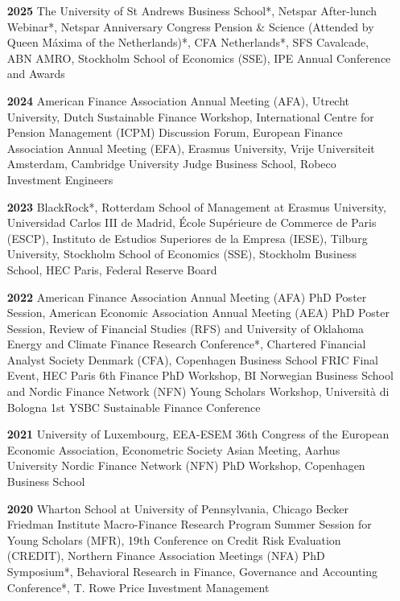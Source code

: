 \documentclass[11pt]{res} %
\begin{document}
\begin{resume}
\begin{itemize}
\item[\textbf{2025}] The University of St Andrews Business School*, Netspar After-lunch Webinar*, Netspar Anniversary Congress Pension \& Science (Attended by Queen Máxima of the Netherlands)*, CFA Netherlands*, SFS Cavalcade, ABN AMRO, Stockholm School of Economics (SSE), IPE Annual Conference and Awards\\[-1ex] 

\item[\textbf{2024}] American Finance Association Annual Meeting (AFA), Utrecht University, Dutch Sustainable Finance Workshop, International Centre for Pension Management (ICPM)  Discussion Forum, European Finance Association Annual Meeting (EFA), Erasmus University, Vrije Universiteit Amsterdam, Cambridge University Judge Business School, Robeco Investment Engineers\\[-1ex] %

\item[\textbf{2023}] BlackRock*, Rotterdam School of Management at Erasmus University, Universidad Carlos III de Madrid, École Supérieure de Commerce de Paris (ESCP), Instituto de Estudios Superiores de la Empresa (IESE), Tilburg University, Stockholm School of Economics (SSE), Stockholm Business School, HEC Paris, Federal Reserve Board\\[-1ex]

\item[\textbf{2022}]  American Finance Association Annual Meeting (AFA) PhD Poster Session, American Economic Association Annual Meeting (AEA) PhD Poster Session, Review of Financial Studies (RFS) and University of Oklahoma Energy and Climate Finance Research Conference*, Chartered Financial Analyst Society Denmark (CFA), Copenhagen Business School FRIC Final Event, HEC Paris 6th Finance PhD Workshop,  BI Norwegian Business School and Nordic Finance Network (NFN) Young Scholars Workshop, Università di Bologna 1st YSBC Sustainable Finance Conference\\[-1ex]

\item[\textbf{2021}]  University of Luxembourg, EEA-ESEM 36th Congress of the European Economic Association, Econometric Society Asian Meeting,  Aarhus University Nordic Finance Network (NFN) PhD Workshop, Copenhagen Business School\\[-1ex]

\item[\textbf{2020}]  Wharton School at University of Pennsylvania, Chicago Becker Friedman Institute Macro-Finance Research Program Summer Session for Young Scholars (MFR), 19th Conference on Credit Risk Evaluation (CREDIT), Northern Finance Association Meetings (NFA) PhD Symposium*, Behavioral Research in Finance, Governance and Accounting Conference*, T. Rowe Price Investment Management\\[-1ex]


\end{itemize}
\end{resume}
\end{document}
